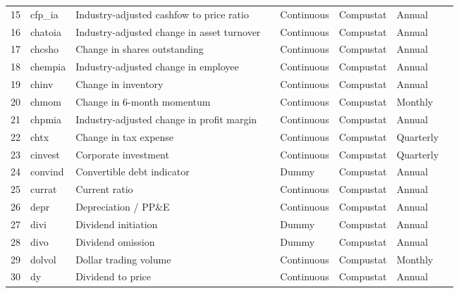 \documentclass[a4paper, table]{article}
\begin{document}
\begin{landscape}
\begin{table}
\begin{center}
\begin{longtable}{llllllll}
			15 & cfp\_ia & Industry-adjusted cashfow to price ratio & 
				\cite{asness_predicting_2000} & Continuous & Compustat & Annual \\
			16 & chatoia & Industry-adjusted change in asset turnover & 
				\cite{soliman_use_2008} & Continuous & Compustat & Annual \\
			17 & chcsho & Change in shares outstanding & 
				\cite{pontiff_share_2008} & Continuous & Compustat & Annual \\
			18 & chempia & Industry-adjusted change in employee & 
				\cite{asness_predicting_2000} & Continuous & Compustat & Annual \\
			19 & chinv & Change in inventory & 
				\cite{thomas_inventory_2002} & Continuous & Compustat & Annual \\
			20 & chmom & Change in 6-month momentum & 
				\cite{gettleman_acceleration_2006} & Continuous & Compustat & Monthly \\
			21 & chpmia & Industry-adjusted change in profit margin & 
				\cite{soliman_use_2008} & Continuous & Compustat & Annual \\
			22 & chtx & Change in tax expense & 
				\cite{thomas_tax_2011} & Continuous & Compustat & Quarterly \\
			23 & cinvest & Corporate investment & 
				\cite{titman_capital_2004} & Continuous & Compustat & Quarterly \\
			24 & convind & Convertible debt indicator & 
				\cite{valta_strategic_2016} & Dummy & Compustat & Annual \\
			25 & currat & Current ratio & 
				\cite{ou_financial_1989} & Continuous & Compustat & Annual \\
			26 & depr & Depreciation / PP\&E & 
				\cite{holthausen_prediction_1992} & Continuous & Compustat & Annual \\
			27 & divi & Dividend initiation & 
				\cite{michaely_price_1995} & Dummy & Compustat & Annual \\
			28 & divo & Dividend omission & 
				\cite{michaely_price_1995} & Dummy & Compustat & Annual \\
			29 & dolvol & Dollar trading volume & 
				\cite{chordia_trading_2001} & Continuous & Compustat & Monthly \\
			30 & dy & Dividend to price & 
				\cite{litzenberger_effects_1982} & Continuous & Compustat & Annual \\

\end{longtable}
\end{center}
\end{table}
\end{landscape}
\end{document}
